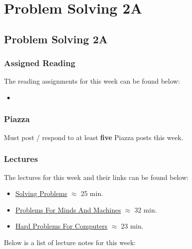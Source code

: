 \clearpage

\renewcommand{\ChapTitle}{Problem Solving 2A}
\renewcommand{\SectionTitle}{Problem Solving 2A}

\chapter{\ChapTitle}
\section{\SectionTitle}

\subsection{Assigned Reading}

The reading assignments for this week can be found below:

\begin{itemize}
    \item {}
\end{itemize}

\subsection{Piazza}

Must post / respond to at least \textbf{five} Piazza posts this week.

\subsection{Lectures}

The lectures for this week and their links can be found below:

\begin{itemize}
    \item \href{https://www.youtube.com/watch?v=YvkDeQP-pQM}{Solving Problems} $\approx$ 25 min.
    \item \href{https://www.youtube.com/watch?v=8h0okzEM13M}{Problems For Minds And Machines} $\approx$ 32 min.
    \item \href{https://www.youtube.com/watch?v=6qwk8NKR0UM}{Hard Problems For Computers} $\approx$ 23 min.
\end{itemize}

\noindent Below is a list of lecture notes for this week:

